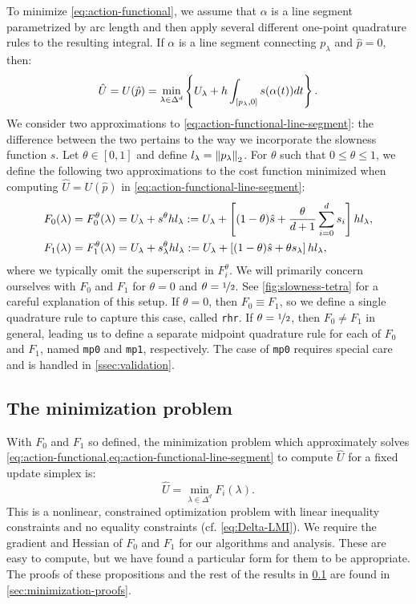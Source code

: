 \documentclass[sisc-eikonal.tex]{subfiles}
\begin{document}
To minimize \cref{eq:action-functional}, we assume that $\alpha$ is a
line segment parametrized by arc length and then apply several
different one-point quadrature rules to the resulting integral. If
$\alpha$ is a line segment connecting $p_\lambda$ and $\hat{p} = 0$,
then:
\begin{equation}
  \label{eq:action-functional-line-segment}
  \hat{U} = U(\hat{p}) = \min_{\lambda \in \Delta^d} \set{U_\lambda + h \int_{[p_\lambda, 0]} s(\alpha(t))dt}.
\end{equation}
We consider two approximations to
\cref{eq:action-functional-line-segment}: the difference between the
two pertains to the way we incorporate the slowness function $s$. Let
$\theta \in [0, 1]$ and define $l_\lambda = \left\|p_\lambda\right\|_2$. For
$\theta$ such that $0 \leq \theta \leq 1$, we define the following two
approximations to the cost function minimized when computing
$\hat{U} = U(\hat{p})$ in \cref{eq:action-functional-line-segment}:
\begin{align}
  F_0(\lambda) = F_0^\theta(\lambda) &= U_\lambda + s^{\theta} h l_\lambda := U_\lambda + \squareb{(1-\theta)\hat{s} + \frac{\theta}{d + 1} \sum_{i=0}^d s_i} h l_\lambda, \label{eq:f0-definition} \\
  F_1(\lambda) = F_1^\theta(\lambda) &= U_\lambda + s^{\theta}_\lambda h l_\lambda := U_\lambda + \squareb{(1-\theta)\hat{s} + \theta s_\lambda} h l_\lambda,
\end{align}
where we typically omit the superscript in $F_i^\theta$. We will
primarily concern ourselves with $F_0$ and $F_1$ for $\theta = 0$ and
$\theta = \nicefrac{1}{2}$. See \cref{fig:slowness-tetra} for a
careful explanation of this setup. If $\theta = 0$, then
$F_0 \equiv F_1$, so we define a single quadrature rule to capture
this case, called \texttt{rhr}. If $\theta = \nicefrac{1}{2}$, then
$F_0 \neq F_1$ in general, leading us to define a separate midpoint
quadrature rule for each of $F_0$ and $F_1$, named \texttt{mp0} and
\texttt{mp1}, respectively. The case of \texttt{mp0} requires special
care and is handled in \cref{ssec:validation}.

\subsection{The minimization problem}\label{ssec:minimization-problem}

With $F_0$ and $F_1$ so defined, the minimization problem which
approximately solves
\cref{eq:action-functional,eq:action-functional-line-segment} to
compute $\hat{U}$ for a fixed update simplex is:
\begin{equation}
  \label{eq:constrained-minimization}
  \hat{U} = \min_{\lambda \in \Delta^d} F_i(\lambda).
\end{equation}
This is a nonlinear, constrained optimization problem with linear
inequality constraints and no equality constraints (cf.\@
\cref{eq:Delta-LMI}). We require the gradient and Hessian of $F_0$ and
$F_1$ for our algorithms and analysis. These are easy to compute, but
we have found a particular form for them to be appropriate. The proofs
of these propositions and the rest of the results in
\cref{ssec:minimization-problem} are found in
\cref{sec:minimization-proofs}.
\end{document}
